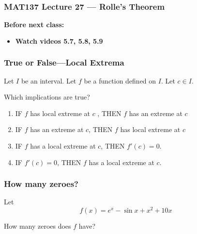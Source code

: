 \documentclass[14pt]{beamer}
\begin{document}
\begin{frame}
	\frametitle{MAT137 Lecture 27 --- Rolle's Theorem}

	\vfill
	{\bf Before next class:}
		\begin{itemize} \normalsize
			\item {\bf Watch videos  5.7, 5.8, 5.9}
		\end{itemize}
\end{frame}


	\begin{frame}[t]
		\frametitle{True or False---Local Extrema}

		Let $I$ be an interval. Let $f$ be a function defined on $I$. Let $c\in I$.

		Which implications are true?
		\begin{enumerate}
			\item IF $f$ has local extreme at $c$ , THEN $f$ has an extreme at $c$
			\item IF $f$ has an extreme at $c$, THEN $f$ has local extreme at $c$
			\item IF $f$ has a local extreme at $c$, THEN $f' (c ) = 0$.
			\item IF $f'(c ) = 0$, THEN $f$ has a local extreme at $c$.
		\end{enumerate}

	\end{frame}

	\begin{frame}[t]
		\frametitle{How many zeroes?}

		Let
		\[
			f(x) = e^{x}- \sin x + x^{2}+ 10x
		\]

		How many zeroes does $f$ have?
	\end{frame}
\end{document}
